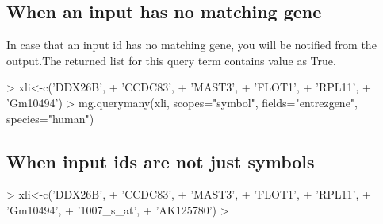 \documentclass[12pt]{article}
\begin{document}
\subsection{When an input has no matching gene}

In case that an input id has no matching gene, you will be notified from the output.The returned list for this query term contains  value as True.

\begin{Schunk}
\begin{Sinput}
> xli<-c('DDX26B',
+  'CCDC83',
+  'MAST3',
+  'FLOT1',
+  'RPL11',
+  'Gm10494')
> mg.querymany(xli, scopes="symbol", fields="entrezgene", species="human")
\end{Sinput}
\end{Schunk}

\subsection{When input ids are not just symbols}

\begin{Schunk}
\begin{Sinput}
> xli<-c('DDX26B',
+  'CCDC83',
+  'MAST3',
+  'FLOT1',
+  'RPL11',
+  'Gm10494',
+  '1007_s_at',
+  'AK125780')
> 
\end{Sinput}
\end{Schunk}
\end{document}
